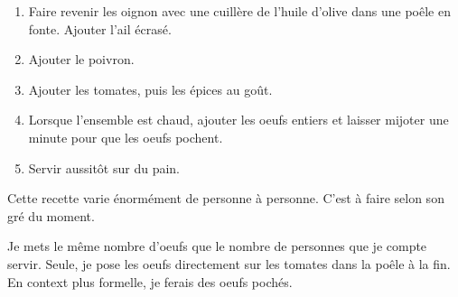 
\begin{ingredients}
\end{ingredients}


\begin{recipe}
  \begin{enumerate}

  \item Faire revenir les oignon avec une cuillère de l'huile d'olive
    dans une poêle en fonte.  Ajouter l'ail écrasé.

  \item Ajouter le poivron.

  \item Ajouter les tomates, puis les épices au goût.

  \item Lorsque l'ensemble est chaud, ajouter les oeufs entiers et
    laisser mijoter une minute pour que les oeufs pochent.

  \item Servir aussitôt sur du pain.

  \end{enumerate}
\end{recipe}


Cette recette varie énormément de personne à personne.  C'est à faire selon son gré du moment.

Je mets le même nombre d'oeufs que le nombre de personnes que je
compte servir.  Seule, je pose les oeufs directement sur les tomates
dans la poêle à la fin.  En context plus formelle, je ferais des oeufs
pochés.
